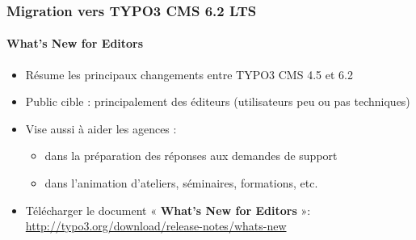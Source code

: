 \begin{frame}[fragile]
	\frametitle{Migration vers TYPO3 CMS 6.2 LTS}
	\framesubtitle{What's New for Editors}

	\begin{itemize}
		\item Résume les principaux changements entre TYPO3 CMS 4.5 et 6.2
		\item Public cible : principalement des éditeurs (utilisateurs peu ou pas techniques)
		\item Vise aussi à aider les agences :

			\begin{itemize}
				\item dans la préparation des réponses aux demandes de support
				\item dans l'animation d'ateliers, séminaires, formations, etc.
			\end{itemize}

		\item Télécharger le document « \textbf{What's New for Editors} »:\newline
			\smaller\url{http://typo3.org/download/release-notes/whats-new}\normalsize

	\end{itemize}

\end{frame}


